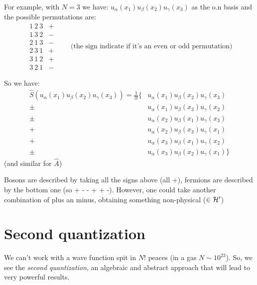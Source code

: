     For example, with $N = 3$ we have: $u_\alpha(x_1) u_\beta(x_2) u_\gamma(x_3)$ as the o.n basis and the possible permutations are: 
    $$\begin{matrix}
        1 \ 2 \ 3 & + \\
        1 \ 3 \ 2 & - \\
        2 \ 1 \ 3 & - \\
        2 \ 3 \ 1 & + \\
        3 \ 1 \ 2 & + \\
        3 \ 2 \ 1 & -
    \end{matrix} \qquad \text{(the sign indicate if it's an even or odd permutation)}$$
    
    So we have: 
    \begin{align*}
        \widehat S\left(u_\alpha(x_1) u_\beta(x_2) u_\gamma(x_3)\right) = \frac1{3!} \bigg\{&u_\alpha(x_1) u_\beta(x_2) u_\gamma(x_3) \\
        \pm\  &u_\alpha(x_1) u_\beta(x_3) u_\gamma(x_2)\\
        \pm\ &u_\alpha(x_2) u_\beta(x_1) u_\gamma(x_3)\\
        +\ &u_\alpha(x_2) u_\beta(x_3) u_\gamma(x_1)\\
        +\ &u_\alpha(x_3) u_\beta(x_1) u_\gamma(x_2)\\
        \pm\ &u_\alpha(x_3) u_\beta(x_2) u_\gamma(x_1)  \bigg\}
    \end{align*}
    (and similar for $\widehat A$)
    
    Bosons are described by taking all the signs above (all +), fermions are described by the bottom one (so + - - + + -). However, one could take another combination of plus an minus, obtaining something non-physical ($\in \mathcal{H}'$)


\section{Second quantization}
We can't work with a wave function spit in $N!$ peaces (in a gas $N\sim 10^{23}$). So, we see the \textit{second quantization}, an algebraic and abstract approach that will lead to very powerful results.



